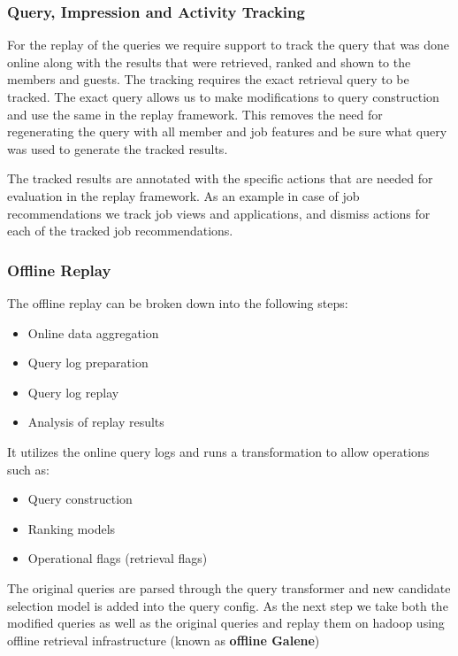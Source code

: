 \subsubsection{Query, Impression and Activity Tracking}

For the replay of the queries we require support to track the query that 
was done online along with the results that were retrieved, ranked and 
shown to the members and guests. The tracking requires the exact retrieval 
query to be tracked. 
The exact query allows us to make modifications to query construction 
and use the same in the replay framework. This removes the need 
for regenerating the query with all member and job features and be sure 
what query was used to generate the tracked results. 

The tracked results are annotated with the specific actions that are needed 
for evaluation in the replay framework. As an example in case of job 
recommendations we track job views and applications, and dismiss actions 
for each of the tracked job recommendations. 

\subsubsection{Offline Replay}
The offline replay can be broken down into the following steps: 
\begin{itemize}
\item Online data aggregation
\item Query log preparation
\item Query log replay
\item Analysis of replay results 
\end{itemize}

It utilizes the online query logs and runs a transformation to allow operations such as:
\begin{itemize}
\item Query construction 
\item Ranking models
\item Operational flags (retrieval flags) 
\end{itemize}

The original queries are parsed through the query transformer and 
new candidate selection model is added into the query config. 
As the next step we take both the modified queries as well as the original 
queries and replay them on hadoop using offline retrieval infrastructure (known
as {\bf offline Galene})

